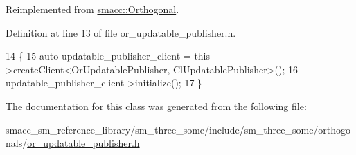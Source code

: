 Reimplemented from \hyperlink{classsmacc_1_1Orthogonal_a7a3da420b1554e20aea3ed01067df05c}{smacc\+::\+Orthogonal}.



Definition at line 13 of file or\+\_\+updatable\+\_\+publisher.\+h.


\begin{DoxyCode}
14     \{
15         \textcolor{keyword}{auto} updatable\_publisher\_client = this->createClient<OrUpdatablePublisher, ClUpdatablePublisher>();
16         updatable\_publisher\_client->initialize();
17     \}
\end{DoxyCode}


The documentation for this class was generated from the following file\+:\begin{DoxyCompactItemize}
\item 
smacc\+\_\+sm\+\_\+reference\+\_\+library/sm\+\_\+three\+\_\+some/include/sm\+\_\+three\+\_\+some/orthogonals/\hyperlink{sm__three__some_2include_2sm__three__some_2orthogonals_2or__updatable__publisher_8h}{or\+\_\+updatable\+\_\+publisher.\+h}\end{DoxyCompactItemize}
